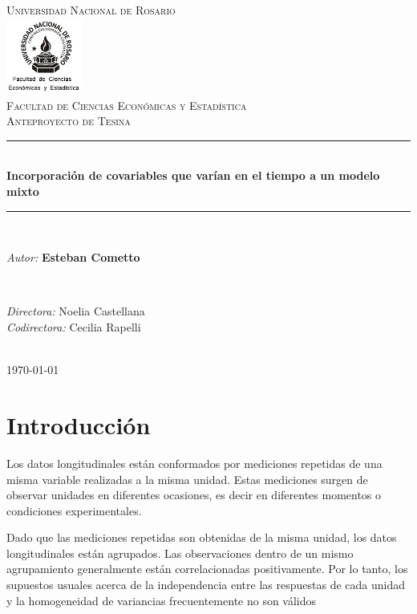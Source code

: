 \documentclass[spanish]{article}
\title{\thesistitle}
\author{\thesisauthorfirst\space\thesisauthorsecond}
\date{\thesisdate}
\numberwithin{figure}{subsection}
\numberwithin{equation}{subsection}
\numberwithin{table}{subsection}
\def\thesistitle{Incorporación de covariables que varían en el tiempo a un modelo mixto}
\def\thesisauthorfirst{\textbf{Esteban Cometto}}
\def\thesissupervisorfirst{Noelia Castellana}
\def\thesissupervisorsecond{Cecilia Rapelli}
\def\thesisdate{\today}
\begin{document}
\begin{titlepage}
    \newcommand{\HRule}{\rule{\linewidth}{0.5mm}}
	\center
	\textsc{\Large Universidad Nacional de Rosario}\\[.7cm]
	\includegraphics[width=25mm]{img/fceye-unr.png}\\[.5cm]
	\textsc{Facultad de Ciencias Económicas y Estadística}\\[0.5cm]
	\textsc{Anteproyecto de Tesina}
	
	\HRule \\[0.4cm]
	{ \huge \bfseries \thesistitle}\\[0.1cm]
	\HRule \\[.5cm]
	
	\begin{minipage}{0.6\textwidth}
	\large
	\textit{Autor:}	\thesisauthorfirst
	\end{minipage}
	\\[.6cm]
	\begin{minipage}{0.6\textwidth}
	\textit{Directora:} 	\thesissupervisorfirst \\[.2cm]
	\textit{Codirectora:} 	\thesissupervisorsecond
	\end{minipage}
	\\[4cm]
	\vfill
	{\large \thesisdate}\\
	\clearpage
\end{titlepage}

\newpage
\tableofcontents

\newpage
\section{Introducción}


Los datos longitudinales están conformados por mediciones repetidas de una
misma variable realizadas a la misma unidad. Estas mediciones surgen de
observar unidades en diferentes ocasiones, es decir en diferentes momentos o
condiciones experimentales.

Dado que las mediciones repetidas son obtenidas de la misma unidad, los datos
longitudinales están agrupados. Las observaciones dentro de un mismo
agrupamiento generalmente están correlacionadas positivamente. Por lo tanto,
los supuestos usuales acerca de la independencia entre las respuestas de cada
unidad y la homogeneidad de variancias frecuentemente no son válidos
\end{document}
